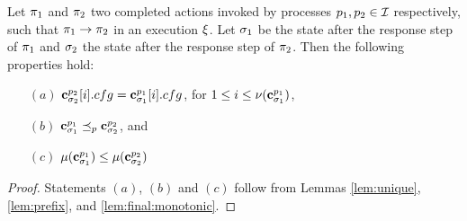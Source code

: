 \begin{theorem}
	Let $\pi_1$ and $\pi_2$ two 
completed  actions invoked by processes $p_1, p_2\in\mathcal{I}$ 
respectively, such that $\pi_1\rightarrow\pi_2$ in an execution $\EX$. 
Let $\sigma_1$ be the state after the response 
step of $\pi_1$ and $\sigma_2$ the state after the response step 
of $\pi_2$.
Then the following properties hold: 
\begin{enumerate}
\item [$(a)$] 
$\mathbf{c}^{p_2}_{\sigma_2}[i].cfg = \mathbf{c}^{p_1}_{\sigma_1}[i].cfg$,  for $ 1 \leq i \leq \nu(\mathbf{c}^{p_1}_{\sigma_1})$,
\item [$(b)$]
 $\mathbf{c}^{p_1}_{\sigma_1}  \preceq_p \mathbf{c}^{p_2}_{\sigma_2}$, and
\item [$(c)$] 
  $\mu(\mathbf{c}^{p_1}_{\sigma_1}) \leq \mu(\mathbf{c}^{p_2}_{\sigma_2})$
\end{enumerate}
\end{theorem}

\begin{proof}
Statements $(a)$, $(b)$ and $(c)$ follow from Lemmas \ref{lem:unique}, \ref{lem:prefix}, and 
\ref{lem:final:monotonic}.
\end{proof}